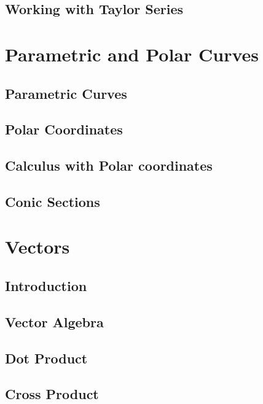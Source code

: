 \documentclass[symmetric,justified,marginals=justified,notoc]{tufte-book}
\theoremstyle{mytheoremstyle}
\begin{document}
	\section{Working with Taylor Series}
	\lipsum[31-50]

\chapter{Parametric and Polar Curves}

	\section{Parametric Curves }
	\lipsum[31-50]
	
	\section{Polar Coordinates}
	\lipsum[31-50]
	
	\section{Calculus with Polar coordinates}
	\lipsum[31-50]
	
	\section{Conic Sections}
	\lipsum[31-50]
	
\chapter{Vectors}

	\section{Introduction}
	\lipsum[31-50]
	
	\section{Vector Algebra}
	\lipsum[31-50]
	
	\section{Dot Product}
	\lipsum[31-50]
	
	\section{Cross Product}
	\lipsum[31-50]
\end{document}
